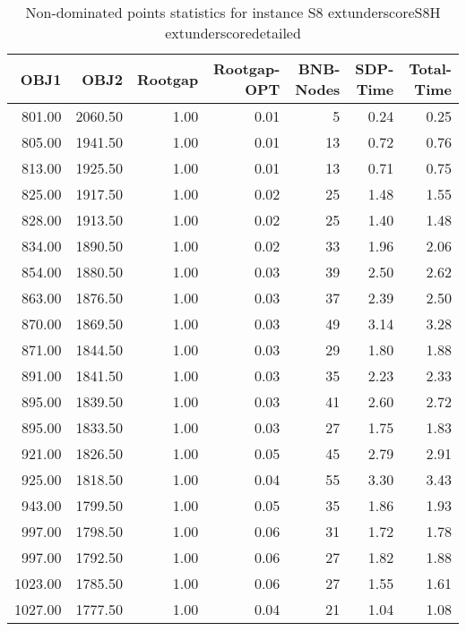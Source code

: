 \begin{table}
\caption{Non-dominated points statistics for instance S8	extunderscoreS8H	extunderscoredetailed}
\label{tab:stats/S8_S8H_detailed}
\begin{tabular}{rrrrrrr}
\toprule
OBJ1 & OBJ2 & Rootgap & Rootgap-OPT & BNB-Nodes & SDP-Time & Total-Time \\
\midrule
801.00 & 2060.50 & 1.00 & 0.01 & 5 & 0.24 & 0.25 \\
805.00 & 1941.50 & 1.00 & 0.01 & 13 & 0.72 & 0.76 \\
813.00 & 1925.50 & 1.00 & 0.01 & 13 & 0.71 & 0.75 \\
825.00 & 1917.50 & 1.00 & 0.02 & 25 & 1.48 & 1.55 \\
828.00 & 1913.50 & 1.00 & 0.02 & 25 & 1.40 & 1.48 \\
834.00 & 1890.50 & 1.00 & 0.02 & 33 & 1.96 & 2.06 \\
854.00 & 1880.50 & 1.00 & 0.03 & 39 & 2.50 & 2.62 \\
863.00 & 1876.50 & 1.00 & 0.03 & 37 & 2.39 & 2.50 \\
870.00 & 1869.50 & 1.00 & 0.03 & 49 & 3.14 & 3.28 \\
871.00 & 1844.50 & 1.00 & 0.03 & 29 & 1.80 & 1.88 \\
891.00 & 1841.50 & 1.00 & 0.03 & 35 & 2.23 & 2.33 \\
895.00 & 1839.50 & 1.00 & 0.03 & 41 & 2.60 & 2.72 \\
895.00 & 1833.50 & 1.00 & 0.03 & 27 & 1.75 & 1.83 \\
921.00 & 1826.50 & 1.00 & 0.05 & 45 & 2.79 & 2.91 \\
925.00 & 1818.50 & 1.00 & 0.04 & 55 & 3.30 & 3.43 \\
943.00 & 1799.50 & 1.00 & 0.05 & 35 & 1.86 & 1.93 \\
997.00 & 1798.50 & 1.00 & 0.06 & 31 & 1.72 & 1.78 \\
997.00 & 1792.50 & 1.00 & 0.06 & 27 & 1.82 & 1.88 \\
1023.00 & 1785.50 & 1.00 & 0.06 & 27 & 1.55 & 1.61 \\
1027.00 & 1777.50 & 1.00 & 0.04 & 21 & 1.04 & 1.08 \\
\bottomrule
\end{tabular}
\end{table}
